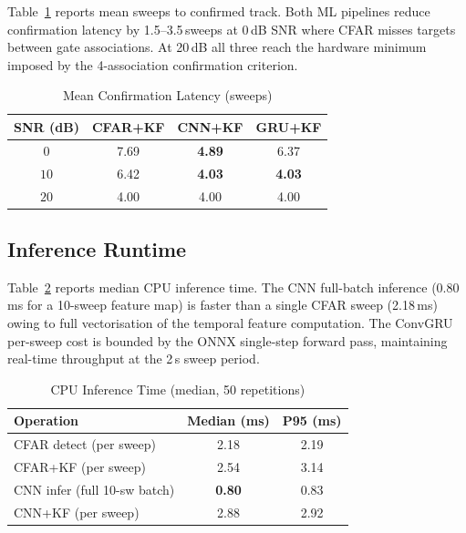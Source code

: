 \documentclass[conference]{IEEEtran}
\begin{document}
Table~\ref{tab:latency} reports mean sweeps to confirmed track.
Both ML pipelines reduce confirmation latency by 1.5--3.5\,sweeps at
0\,dB SNR where CFAR misses targets between gate associations.
At 20\,dB all three reach the hardware minimum imposed by the 4-association
confirmation criterion.

\begin{table}[h]
\caption{Mean Confirmation Latency (sweeps)}
\label{tab:latency}
\centering
\begin{tabular}{cccc}
\toprule
SNR (dB) & CFAR+KF & CNN+KF & GRU+KF \\
\midrule
$0$  & 7.69 & \textbf{4.89} & 6.37 \\
$10$ & 6.42 & \textbf{4.03} & \textbf{4.03} \\
$20$ & 4.00 & 4.00 & 4.00 \\
\bottomrule
\end{tabular}
\end{table}

\subsection{Inference Runtime}

Table~\ref{tab:runtime} reports median CPU inference time.
The CNN full-batch inference (0.80\,ms for a 10-sweep feature map) is
faster than a single CFAR sweep (2.18\,ms) owing to full vectorisation of
the temporal feature computation.
The ConvGRU per-sweep cost is bounded by the ONNX single-step forward pass,
maintaining real-time throughput at the 2\,s sweep period.

\begin{table}[h]
\caption{CPU Inference Time (median, 50 repetitions)}
\label{tab:runtime}
\centering
\begin{tabular}{lcc}
\toprule
Operation & Median (ms) & P95 (ms) \\
\midrule
CFAR detect (per sweep)       & 2.18 & 2.19 \\
CFAR+KF (per sweep)           & 2.54 & 3.14 \\
CNN infer (full 10-sw batch)  & \textbf{0.80} & 0.83 \\
CNN+KF (per sweep)            & 2.88 & 2.92 \\
\bottomrule
\end{tabular}
\end{table}
\end{document}

